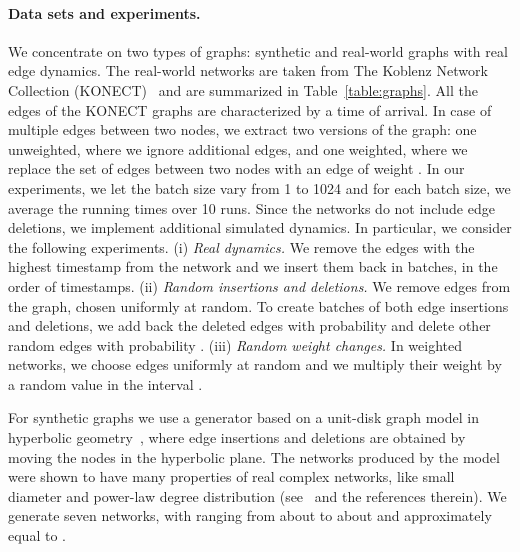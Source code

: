 \documentclass[english]{llncs}
\begin{document}
\paragraph{Data sets and experiments.} We concentrate on two types of graphs: synthetic and real-world graphs with real edge dynamics. The real-world networks are taken from The Koblenz Network Collection (KONECT)~\cite{DBLP:conf/www/Kunegis13} and are summarized in Table~\ref{table:graphs}. All the edges of the KONECT graphs are characterized by a time of arrival. In case of multiple edges between two nodes, we extract two versions of the graph: one unweighted, where we ignore additional edges, and one weighted, where we replace the set   of edges between two nodes with an edge of weight . 
In our experiments, we let the batch size vary from 1 to 1024 and for each batch size, we average the running times over 10 runs.
Since the networks do not include edge deletions, we implement additional simulated dynamics. In particular, we consider the following experiments. (i) \textit{Real dynamics.} We remove the  edges with the highest timestamp from the network and we insert them back in batches, in the order of timestamps. (ii) \textit{Random insertions and deletions.} We remove  edges from the graph, chosen uniformly at random. To create batches of both edge insertions and deletions, we add back the deleted edges with probability  and delete other random edges with probability . (iii) \textit{Random weight changes.} In weighted networks, we choose  edges uniformly at random and we multiply their weight by a random 
value in the interval .

For synthetic graphs we use a generator based on a unit-disk graph model in hyperbolic geometry~\cite{DBLP:journals/corr/LoozSMP15}, where edge insertions and deletions are obtained by moving the nodes in the hyperbolic plane. The networks produced by the model were shown to have many properties of real complex networks, like small diameter and power-law degree distribution (see~\cite{DBLP:journals/corr/LoozSMP15} and the references therein). We generate seven networks, with  ranging from about  to about  and  approximately equal to .
\end{document}
